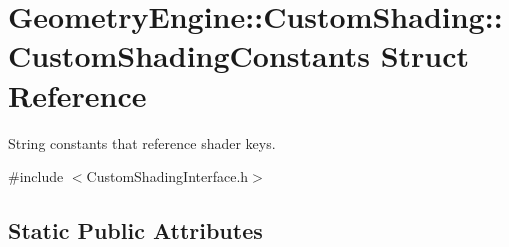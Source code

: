 \hypertarget{struct_geometry_engine_1_1_custom_shading_1_1_custom_shading_constants}{}\section{Geometry\+Engine\+::Custom\+Shading\+::Custom\+Shading\+Constants Struct Reference}
\label{struct_geometry_engine_1_1_custom_shading_1_1_custom_shading_constants}


String constants that reference shader keys.  




{\ttfamily \#include $<$Custom\+Shading\+Interface.\+h$>$}

\subsection*{Static Public Attributes}
